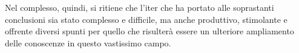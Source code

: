 \documentclass[12pt,a4paper,openright,oneside]{report}
\renewcommand{\chaptermark}[1]{\markboth{\thechapter.\ #1}{}}
\begin{document}
Nel complesso, quindi, si ritiene che l'iter che ha portato alle soprastanti conclusioni sia stato complesso e difficile, ma anche produttivo, stimolante e offrente diversi spunti per quello che risulterà essere un ulteriore ampliamento delle conoscenze in questo vastissimo campo.


\renewcommand{\chaptermark}[1]{\markright{\thechapter \ #1}{}}
\lhead[\fancyplain{}{\bfseries\thepage}]{\fancyplain{}{\bfseries\rightmark}}

\printbibliography[keyword={article},title={Bibliografia}]
\printbibliography[keyword={online},title={Sitografia}]

%
%
\end{document}
